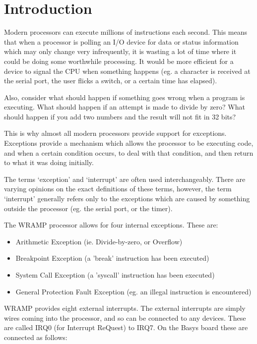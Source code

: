 \section{Introduction}

Modern processors can execute millions of instructions each
second. This means that when a processor is polling an I/O device for
data or status information which may only change very infrequently, it
is wasting a lot of time where it could be doing some worthwhile
processing. It would be more efficient for a device to signal the CPU
when something happens (eg. a character is received at the serial
port, the user flicks a switch, or a certain time has elapsed).

Also, consider what should happen if something goes wrong when a
program is executing. What should happen if an attempt is made to
divide by zero? What should happen if you add two numbers and the
result will not fit in 32 bits?

This is why almost all modern processors provide support for
exceptions. Exceptions provide a mechanism which allows the processor
to be executing code, and when a certain condition occurs, to deal
with that condition, and then return to what it was doing initially.

The terms `exception' and `interrupt' are often used
interchangeably. There are varying opinions on the exact definitions of
these terms, however, the term `interrupt' generally refers only to the
exceptions which are caused by something outside the processor
(eg. the serial port, or the timer).

The WRAMP processor allows for four internal exceptions. These are:

\begin{itemize}
\item Arithmetic Exception (ie. Divide-by-zero, or Overflow)
\item Breakpoint Exception (a 'break' instruction has been executed)
\item System Call Exception (a 'syscall' instruction has been
executed)
\item General Protection Fault Exception (eg. an illegal instruction
is encountered)
\end{itemize}

WRAMP provides eight external interrupts. The external interrupts are
simply wires coming into the processor, and so can be connected to any
devices. These are called IRQ0 (for Interrupt ReQuest) to IRQ7. On the
Basys board these are connected as follows:

